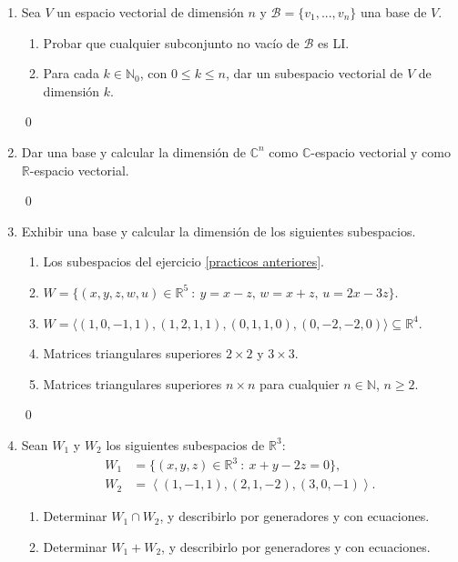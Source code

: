 \begin{enumerate}[resume, topsep=6pt, itemsep=.4cm]
    \item Sea $V$ un espacio vectorial de dimensión $n$ y $\mathcal{B}=\{v_1, ..., v_n\}$ una base de $V$.
    \begin{enumerate}
    \item Probar que cualquier subconjunto no vacío de $\mathcal{B}$ es LI.
    \item Para cada $k\in\mathbb{N}_0$,  con $0\leq k\leq n$, dar un subespacio vectorial de $V$ de dimensión $k$.
    \end{enumerate}
    
    
    \rta 

    \qed     
    
    \item Dar una base y calcular la dimensión de $\mathbb{C}^n$ como $\mathbb{C}$-espacio vectorial y como $\mathbb{R}$-espacio vectorial.
    
    
    \rta 

    \qed     
    
    \item  Exhibir una base y calcular la dimensión de los siguientes subespacios.
    \begin{enumerate}
        \item Los subespacios del ejercicio \ref{practicos anteriores}.
        \item $W = \{(x,y,z,w,u) \in \mathbb{R}^5 \ : \ y = x - z,\, w = x + z,\,  u = 2x - 3z \}$.
        \item $W = \langle (1, 0, -1, 1),  (1, 2, 1, 1), (0, 1, 1, 0), (0, -2, -2, 0) \rangle \subseteq \mathbb R^4$.
        \item Matrices triangulares superiores $2\times 2$ y $3\times 3$.
        \item Matrices triangulares superiores $n\times n$ para cualquier $n\in\mathbb{N}$, $n\geq 2$.
    \end{enumerate}
    
    \rta 

    \qed     
    
    \item Sean $W_1$ y $W_2$ los siguientes subespacios de $\mathbb{R}^3$:
        \begin{align*}
        W_1 &= \{ (x,y,z)\in\mathbb{R}^3\ : \ x+y-2z=0\},  \\
        W_2 &= {\left\langle(1,-1,1),(2,1,-2),(3,0,-1)\right\rangle}.
        \end{align*}
        \begin{enumerate}
            \item  Determinar $W_1 \cap W_2$, y describirlo por generadores y con ecuaciones.
            \item  Determinar $W_1+W_2$, y describirlo por generadores y con ecuaciones.
        \end{enumerate}
    

\end{enumerate}
